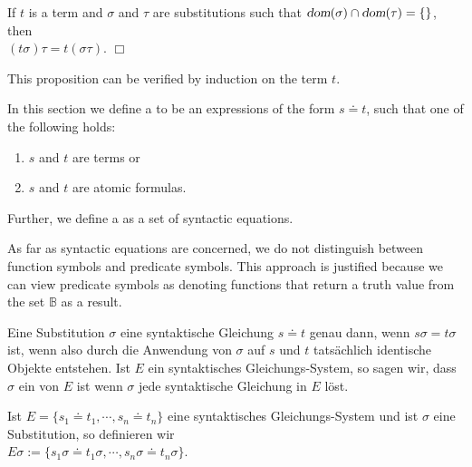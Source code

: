 \begin{Proposition} \label{set:composition}
    If $t$ is a term and $\sigma$ and $\tau$ are substitutions such that
    $\textsl{dom}(\sigma) \cap \textsl{dom}(\tau) = \{\}$, then \\[0.2cm] 
    \hspace*{1.3cm} $(t \sigma)\tau = t (\sigma\tau)$.
    \hspace*{\fill} $\Box$
\end{Proposition}
This proposition can be verified by induction on the term $t$.

\begin{Definition} 
In this section we define a  to be an expressions of the form
$s \doteq t$,  such that one of the following holds:
\begin{enumerate}
\item $s$ and $t$ are terms or
\item $s$ and $t$ are atomic formulas.
\end{enumerate}
Further, we define a  as a set
of syntactic equations. 
\eox
\end{Definition}

As far as syntactic equations are concerned, we do not distinguish between function symbols and predicate
symbols.   This approach is justified because we can view predicate symbols
as denoting functions that return a truth value from the set $\mathbb{B}$ as a result.

\begin{Definition}[Unifikator]
Eine Substitution $\sigma$   eine syntaktische
Gleichung $s \doteq t$ genau dann, wenn 
$s\sigma = t\sigma$ ist, wenn also durch die Anwendung von $\sigma$ auf $s$ und $t$
tatsächlich identische Objekte entstehen.  Ist $E$ ein syntaktisches Gleichungs-System, so 
sagen wir, dass $\sigma$ ein   von $E$ ist wenn $\sigma$ jede
syntaktische Gleichung in $E$ löst. 
\eox
\end{Definition}
Ist $E = \{ s_1 \doteq t_1, \cdots, s_n \doteq t_n \}$ eine syntaktisches Gleichungs-System
und ist $\sigma$ eine Substitution, so definieren wir \\[0.2cm]
\hspace*{1.3cm}  $E\sigma := \{ s_1\sigma \doteq t_1\sigma, \cdots, s_n\sigma \doteq t_n\sigma \}$.
\vspace{0.3cm}

